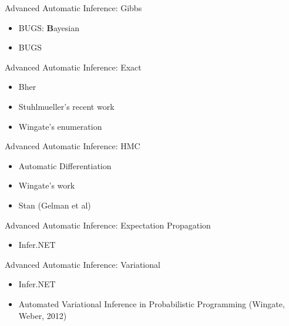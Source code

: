 \begin{frame}{Advanced Automatic Inference: Gibbs}
    \begin{itemize}
      \item BUGS: {\bf B}ayesian
    \end{itemize}
        \begin{itemize}
      \item BUGS
    \end{itemize}
\end{frame}

\begin{frame}{Advanced Automatic Inference: Exact}
    \begin{itemize}
      \item Bher
      \item Stuhlmueller's recent work
      \item Wingate's enumeration
    \end{itemize}
\end{frame}

\begin{frame}{Advanced Automatic Inference: HMC}

    \begin{itemize}
      \item Automatic Differentiation
      \item Wingate's work
      \item Stan (Gelman et al)
    \end{itemize}

\end{frame}

\begin{frame}{Advanced Automatic Inference: Expectation Propagation}

    \begin{itemize}
      \item Infer.NET
    \end{itemize}

\end{frame}

\begin{frame}{Advanced Automatic Inference: Variational}

    \begin{itemize}
      \item Infer.NET
      \item Automated Variational Inference in Probabilistic Programming
(Wingate, Weber, 2012) 
    \end{itemize}

\end{frame}


